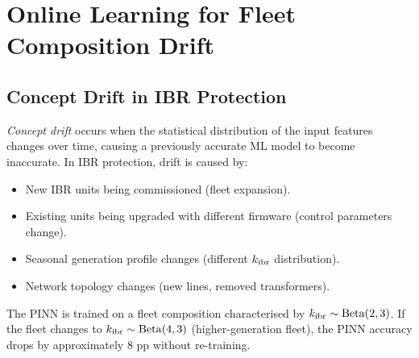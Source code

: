 
\section{Online Learning for Fleet Composition Drift}
\label{sec:ch8_online}

\subsection{Concept Drift in IBR Protection}

\emph{Concept drift} occurs when the statistical distribution of the
input features changes over time, causing a previously accurate ML model
to become inaccurate. In IBR protection, drift is caused by:
\begin{itemize}
\item New IBR units being commissioned (fleet expansion).
\item Existing units being upgraded with different firmware (control parameters change).
\item Seasonal generation profile changes (different $k_{\mathrm{ibr}}$ distribution).
\item Network topology changes (new lines, removed transformers).
\end{itemize}
The PINN is trained on a fleet composition characterised by
$k_{\mathrm{ibr}} \sim \mathrm{Beta}(2, 3)$. If the fleet changes to
$k_{\mathrm{ibr}} \sim \mathrm{Beta}(4, 3)$ (higher-generation fleet), the PINN
accuracy drops by approximately 8 pp without re-training.

